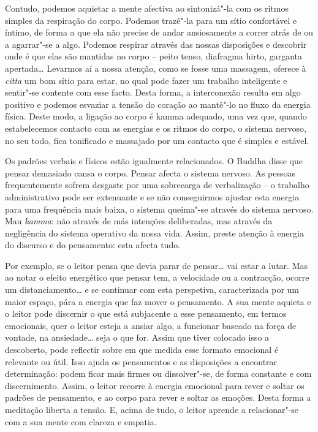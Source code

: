 Contudo, podemos aquietar a mente afectiva ao sintonizá"-la com os ritmos simples
da respiração do corpo. Podemos trazê"-la para um sítio confortável e íntimo, de
forma a que ela não precise de andar ansiosamente a correr atrás de ou a
agarrar"-se a algo. Podemos respirar através das nossas disposições e descobrir
onde é que elas são mantidas no corpo -- peito tenso, diafragma hirto, garganta
apertada\ldots{} Levarmos aí a nossa atenção, como se fosse uma massagem,
oferece à \emph{citta} um bom sítio para estar, no qual pode fazer um trabalho
inteligente e sentir"-se contente com esse facto. Desta forma, a interconexão
resulta em algo positivo e podemos esvaziar a tensão do coração ao mantê"-lo no
fluxo da energia física. Deste modo, a ligação ao corpo é kamma adequado, uma
vez que, quando estabelecemos contacto com as energias e os ritmos do corpo, o
sistema nervoso, no seu todo, fica tonificado e massajado por um contacto que é
simples e estável.

Os padrões verbais e físicos estão igualmente relacionados. O Buddha disse que
pensar demasiado cansa o corpo.
Pensar afecta o sistema nervoso. As pessoas frequentemente sofrem desgaste por
uma sobrecarga de verbalização -- o trabalho administrativo pode ser extenuante
e se não conseguirmos ajustar esta energia para uma frequência mais baixa, o
sistema queima"-se através do sistema nervoso. Mau \emph{kamma}: não através de
más intenções deliberadas, mas através da negligência do sistema operativo da
nossa vida. Assim, preste atenção à energia do discurso e do pensamento: esta
afecta tudo.

Por exemplo, se o leitor pensa que devia parar de pensar\ldots{} vai estar a
lutar. Mas ao notar o efeito energético que pensar tem, a velocidade ou a
contracção, ocorre um distanciamento\ldots{} e se continuar com esta perspetiva,
caracterizada por um maior espaço, pára a energia que faz mover o pensamento. A
sua mente aquieta e o leitor pode discernir o que está subjacente a esse
pensamento, em termos emocionais, quer o leitor esteja a ansiar algo, a
funcionar baseado na força de vontade, na ansiedade\ldots{} seja o que for.
Assim que tiver colocado isso a descoberto, pode reflectir sobre em que medida
esse formato emocional é relevante ou útil. Isso ajuda os pensamentos e as
disposições a encontrar determinação: podem ficar mais firmes ou dissolver"-se,
de forma constante e com discernimento. Assim, o leitor recorre à energia
emocional para rever e soltar os padrões de pensamento, e ao corpo para rever e
soltar as emoções. Desta forma a meditação liberta a tensão. E, acima de tudo, o
leitor aprende a relacionar"-se com a sua mente com clareza e empatia.

